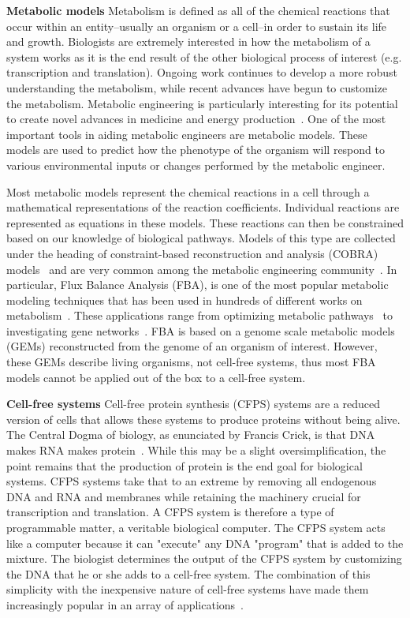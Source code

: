 \textbf{Metabolic models}
Metabolism is defined as all of the chemical reactions that occur within an entity--usually an organism or a cell--in order to sustain its life and growth.
Biologists are extremely interested in how the metabolism of a system works as it is the end result of the other biological process of interest (e.g. transcription and translation).
Ongoing work continues to develop a more robust understanding the metabolism, while recent advances have begun to customize the metabolism. 
Metabolic engineering is particularly interesting for its potential to create novel advances in medicine and energy production~\cite{keasling2012synthetic}.
One of the most important tools in aiding metabolic engineers are metabolic models.
These models are used to predict how the phenotype of the organism will respond to various environmental inputs or changes performed by the metabolic engineer.

Most metabolic models represent the chemical reactions in a cell through a mathematical representations of the reaction coefficients.
Individual reactions are represented as equations in these models.
These reactions can then be constrained based on our knowledge of biological pathways.
Models of this type are collected under the heading of constraint-based reconstruction and analysis (COBRA) models~\cite{schellenberger2011quantitative} and are very common among the metabolic engineering community~\cite{orth2010flux}.
In particular, Flux Balance Analysis (FBA), is one of the most popular metabolic modeling techniques that has been used in hundreds of different works on metabolism~\cite{feist2008growing}.
These applications range from optimizing metabolic pathways~\cite{almaas2004global} to investigating gene networks~\cite{shlomi2007genome}.
FBA is based on a genome scale metabolic models (GEMs) reconstructed from the genome of an organism of interest.
However, these GEMs describe living organisms, not cell-free systems, thus most FBA models cannot be applied out of the box to a cell-free system.

\textbf{Cell-free systems}
Cell-free protein synthesis (CFPS) systems are a reduced version of cells that allows these systems to produce proteins without being alive.
The Central Dogma of biology, as enunciated by Francis Crick, is that DNA makes RNA makes protein~\cite{crick1970central}.
While this may be a slight oversimplification, the point remains that the production of protein is the end goal for biological systems.
CFPS systems take that to an extreme by removing all endogenous DNA and RNA and membranes while retaining the machinery crucial for transcription and translation.
A CFPS system is therefore a type of programmable matter, a veritable biological computer.
The CFPS system acts like a computer because it can "execute" any DNA "program" that is added to the mixture.
The biologist determines the output of the CFPS system by customizing the DNA that he or she adds to a cell-free system.
The combination of this simplicity with the inexpensive nature of cell-free systems have made them increasingly popular in an array of applications~\cite{}.

